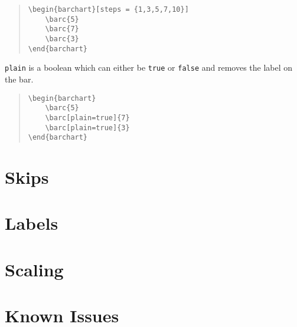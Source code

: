 \documentclass[]{article}
\begin{document}
\begin{quote}\small
\begin{verbatim}
\begin{barchart}[steps = {1,3,5,7,10}]
    \barc{5}
    \barc{7}
    \barc{3}
\end{barchart}
\end{verbatim}
\end{quote}
\begin{quote}\small
\begin{figure}[ht]
	\begin{barchart}[steps = {1,3,5,7,10}]
	\end{barchart}
\end{figure}
\end{quote}

\texttt{plain} is a boolean which can either be \texttt{true} or \texttt{false} and removes the label on the bar.
\begin{quote}\small
\begin{verbatim}
\begin{barchart}
    \barc{5}
    \barc[plain=true]{7}
    \barc[plain=true]{3}
\end{barchart}
\end{verbatim}
\end{quote}
\begin{quote}\small
\begin{figure}[ht]
	\begin{barchart}
	\end{barchart}
\end{figure}
\end{quote}


\section{Skips}

\section{Labels}

\section{Scaling}

\section{Known Issues}
\end{document}
